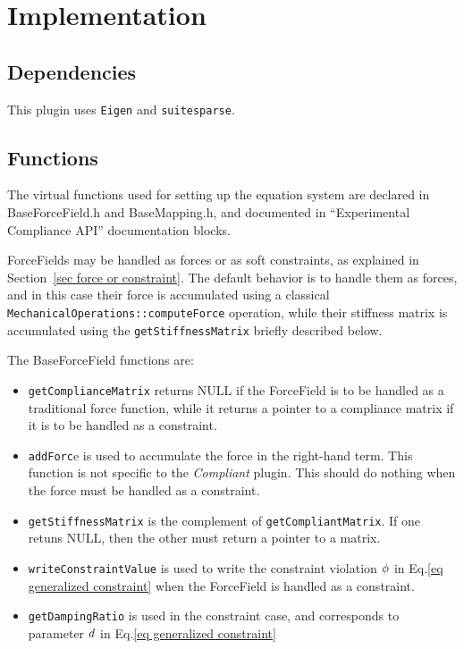 \section{Implementation} \label{sec implementation}

\subsection{Dependencies}
This plugin uses \texttt{Eigen} and \texttt{suitesparse}.

\subsection{Functions}

The virtual functions used for setting up the equation system are declared in BaseForceField.h and BaseMapping.h, and documented in ``Experimental Compliance API'' documentation blocks.

ForceFields may be handled as forces or as soft constraints, as explained in Section~\ref{sec force or constraint}. The default behavior is to handle them as forces, and in this case their force is accumulated using a classical \texttt{MechanicalOperations::computeForce} operation, while their stiffness matrix is accumulated using the \texttt{getStiffnessMatrix} briefly described below.

The BaseForceField functions are:
\begin{itemize}
 \item \texttt{getComplianceMatrix} returns NULL if the ForceField is to be handled as a traditional force function, while it returns a pointer to a compliance matrix if it is to be handled as a constraint.
 \item \texttt{addForc}e is used to accumulate the force in the right-hand term. This function is not specific to the \textit{Compliant} plugin. This should do nothing when the force must be handled as a constraint.
 \item \texttt{getStiffnessMatrix} is the complement of \texttt{getCompliantMatrix}. If one retuns NULL, then the other must return a pointer to a matrix.
 \item \texttt{writeConstraintValue} is used to write the constraint violation $\phi$ in Eq.\ref{eq generalized constraint} when the ForceField is handled as a constraint.
 \item \texttt{getDampingRatio} is used in the constraint case, and corresponds to parameter $ d$ in Eq.\ref{eq generalized constraint}
\end{itemize}

